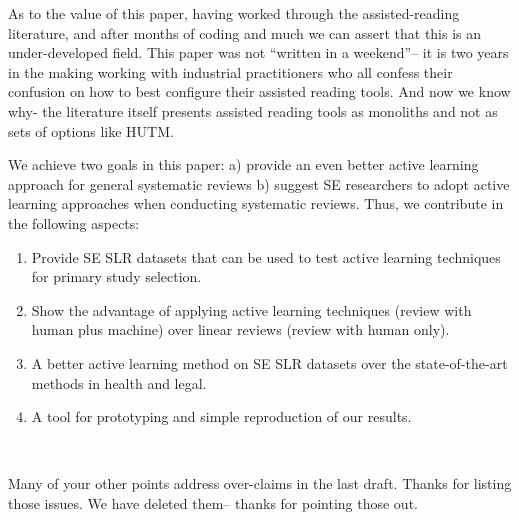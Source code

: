 \documentclass{svjour3}
\theoremstyle{break}
\begin{document}
As to the value of this paper, having worked through the assisted-reading literature, and after months of coding and much  we can assert that this is an under-developed field. This paper was not ``written in a weekend''-- it is two years in the making working with industrial practitioners who all confess their confusion on how to best configure their assisted reading tools. And now we know why- the literature itself presents assisted reading tools as monoliths and not as sets of options like HUTM. 

We achieve two goals in this paper: a) provide an even better active learning approach for general systematic reviews b) suggest SE researchers to adopt active learning approaches when conducting systematic reviews. Thus, we contribute in the following aspects: 
\begin{enumerate}
\item
Provide SE SLR datasets that can be used to test active learning techniques for primary study selection.
\item
Show the advantage of applying active learning techniques (review with human plus machine) over linear reviews (review with human only).
\item
A better active learning method on SE SLR datasets over the state-of-the-art methods in health and legal.
\item
A tool for prototyping and simple reproduction of our results.
\end{enumerate}

\par ~



Many of your other points address over-claims in the last draft. Thanks for listing those issues. We have deleted them-- thanks for pointing those out.
\end{document}

